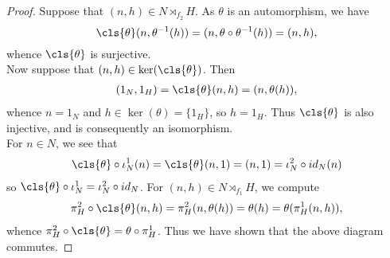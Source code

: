 \documentclass[12pt]{article}
\begin{document}
\begin{homeworkProblem}
\begin{proof}
     Suppose that $ (n,h)\in N\rtimes_{f_{2}} H $. As $ \theta $ is an automorphism, we have $$ \cls{\theta}(n, \theta^{-1}(h)) = (n, \theta\circ \theta^{-1}(h)) = (n,h),  $$
    whence $ \cls{\theta} $  is surjective.\\

    Now suppose that $ (n,h)\in \ker(\cls{\theta}) $. Then 
    \begin{align*}
      (1_N, 1_H) = \cls{\theta}(n,h) = (n, \theta(h)),
    \end{align*}
    whence $ n = 1_N  $ and $ h\in \ker(\theta) = \{1_H\} $, so $ h=1_H $. Thus $ \cls{\theta} $ is also injective, and is consequently an isomorphism.\\


    For $ n\in N $, we see that
    \begin{align*}
      \cls{\theta}\circ \iota_{N}^{1}(n) = \cls{\theta}(n,1) = (n,1) = \iota_{N}^{2}\circ id_{N}(n)
    \end{align*}
    so $ \cls{\theta}\circ \iota_{N}^{1} = \iota_{N}^{2} \circ id_{N} $. For $ (n,h)\in N\rtimes_{f_{1}}H $, we compute
    \begin{align*}
      \pi_{H}^{2}\circ \cls{\theta}(n,h) = \pi_{H}^{2}(n,\theta(h)) = \theta(h) = \theta(\pi_{H}^{1}(n,h)),
    \end{align*}
    whence $ \pi_{H}^{2}\circ \cls{\theta} = \theta\circ \pi_{H}^{1} $. Thus we have shown that the above diagram commutes.
   
  \end{proof}

\end{homeworkProblem}
\end{document}
